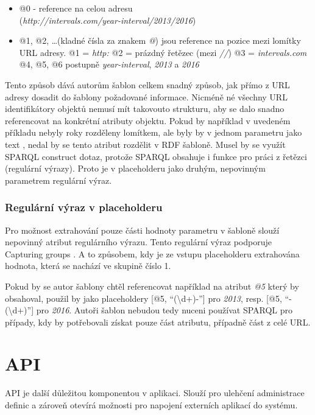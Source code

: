\documentclass[thesis=B,czech]{FITthesis}[2012/06/26]
\begin{document}
 \begin{itemize}
  \item @0 - reference na celou adresu\\(\textit{http://intervals.com/year-interval/2013/2016})
  \item @1, @2, \ldots (kladné čísla za znakem \textit{@}) jsou reference na pozice mezi lomítky URL adresy.
    \subitem @1 = \textit{http:}
    \subitem @2 = prázdný řetězec (mezi \textit{//})
    \subitem @3 = \textit{intervals.com}
    \subitem @4, @5, @6 postupně \textit{year-interval}, \textit{2013} a \textit{2016}
 \end{itemize}
 Tento způsob dává autorům šablon celkem snadný způsob, jak přímo z URL adresy dosadit do šablony požadované informace. Nicméně né všechny URL identifikátory objektů
 nemusí mít takovouto strukturu, aby se dalo snadno referencovat na konkrétní atributy objektu. Pokud by například v uvedeném příkladu nebyly roky rozděleny lomítkem,
 ale byly by v jednom parametru jako text , nedal by se tento atribut rozdělit v RDF šabloně. Musel by se využít SPARQL construct dotaz, protože
 SPARQL obsahuje i funkce pro práci z řetězci (regulární výrazy). Proto je v placeholderu jako druhým, nepovinným parametrem regulární výraz.
 
 \subsubsection{Regulární výraz v placeholderu}
  Pro možnost extrahování pouze části hodnoty parametru v šabloně slouží nepovinný atribut regulárního výrazu. Tento regulární výraz
  podporuje Capturing groups \cite{capture_group}. A to způsobem, kdy je ze vstupu placeholderu extrahována hodnota, která se nachází ve skupině číslo 1.
  
  Pokud by se autor šablony chtěl referencovat například na atribut \textit{@5} který by obsahoval, 
  použil by jako placeholdery [@5, ``(\textbackslash d+)-''] pro \textit{2013}, resp. [@5, ``-(\textbackslash d+)''] pro \textit{2016}.
  Autoři šablon nebudou tedy nuceni používat SPARQL pro případy, kdy by potřebovali získat pouze část atributu, případně část z celé URL.
  
  \section{API}
  API je další důležitou komponentou v aplikaci. Slouží pro ulehčení administrace definic a zároveň otevírá možnosti pro napojení externích
  aplikací do systému. 
  
\end{document}
